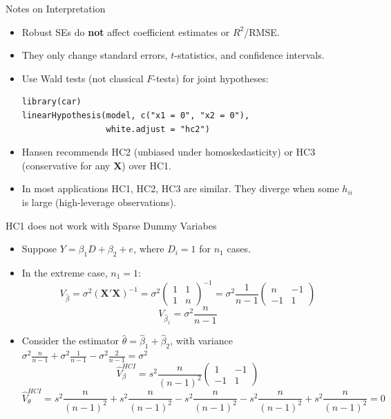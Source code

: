 \documentclass[aspectratio=169]{beamer}
\numberwithin{equation}{section}
\begin{document}
\begin{frame}[fragile]{Notes on Interpretation}
\begin{itemize}
\item Robust SEs do \textbf{not} affect coefficient estimates or $R^2$/RMSE.
\item They only change standard errors, $t$-statistics, and confidence intervals. \pause
\item Use Wald tests (not classical $F$-tests) for joint hypotheses:
\begin{lstlisting}
library(car)
linearHypothesis(model, c("x1 = 0", "x2 = 0"),
                 white.adjust = "hc2")
\end{lstlisting}\pause
\item Hansen recommends HC2 (unbiased under homoskedasticity) or HC3 (conservative for any $\bm{X}$) over HC1.
\item In most applications HC1, HC2, HC3 are similar.  They diverge when some $h_{ii}$ is large (high-leverage observations).
\end{itemize}
\end{frame}


\begin{frame}{HC1 does not work with Sparse Dummy Variabes}
\begin{itemize}
\item Suppose $Y=\beta_1D+\beta_2+e$, where $D_i=1$ for $n_1$ cases.
\item In the extreme case, $n_1=1$:
$$V_{\hat{\beta}}=\sigma^2(\bm{X'X})^{-1}=\sigma^2\begin{pmatrix}1&1\\1&n\end{pmatrix}^{-1}=\sigma^2\frac{1}{n-1}\begin{pmatrix}n&-1\\-1&1\end{pmatrix}$$
$$V_{\hat{\beta}_1}=\sigma^2\frac{n}{n-1}$$
\item Consider the estimator $\hat{\theta}=\hat{\beta}_1+\hat{\beta}_2$, with variance $\sigma^2\frac{n}{n-1}+\sigma^2\frac{1}{n-1}-\sigma^2\frac{2}{n-1}=\sigma^2$
$$\hat{V}^{HCI}_\beta=s^2\frac{n}{(n-1)^2}\begin{pmatrix}1&-1\\-1&1\end{pmatrix}$$
$$\hat{V}^{HCI}_\theta=s^2\frac{n}{(n-1)^2}+s^2\frac{n}{(n-1)^2}-s^2\frac{n}{(n-1)^2}-s^2\frac{n}{(n-1)^2}+s^2\frac{n}{(n-1)^2}=0$$
\end{itemize}
\end{frame}
\end{document}
